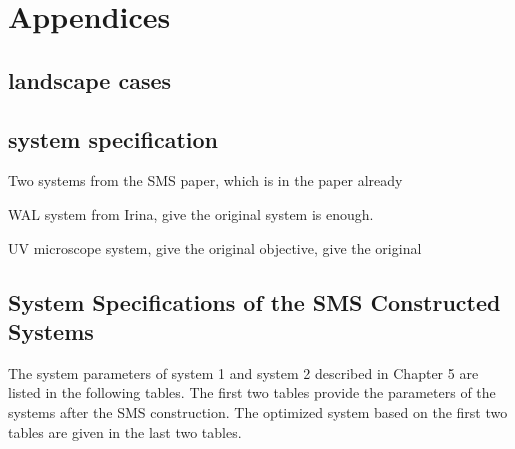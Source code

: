 \chapter{Appendices} %
\label{Appendices} %
\graphicspath{ {./Appendix/figures/} }  %
\captionsetup[figure]{labelfont=bf}
\captionsetup{margin=1.5em}
\captionsetup[table]{labelfont=bf}





\section{landscape cases}
\section{system specification}
\item Two systems from the SMS paper, which is in the paper already
\item WAL system from Irina, give the original system is enough.
\item UV microscope system, give the original 
\DUV objective, give the original

\section{System Specifications of the SMS Constructed Systems}\label{apdx: chapter-5-system-spec}
The system parameters of system 1 and system 2 described in Chapter 5 are listed in the following tables. The first two tables provide the parameters of the systems after the SMS construction. The optimized system based on the first two tables are given in the last two tables. 

